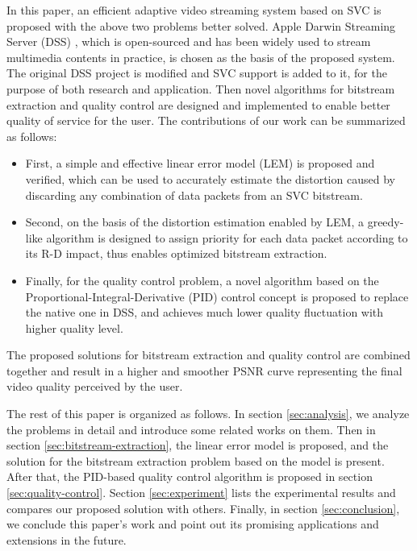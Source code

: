 \documentclass[journal]{IEEEtran}
\begin{document}
In this paper, an efficient adaptive video streaming system based on SVC is proposed with the above two problems better solved. Apple Darwin Streaming Server (DSS) \cite{DSS}, which is open-sourced and has been widely used to stream multimedia contents in practice, is chosen as the basis of the proposed system. The original DSS project is modified and SVC support is added to it, for the purpose of both research and application. Then novel algorithms for bitstream extraction and quality control are designed and implemented to enable better quality of service for the user. The contributions of our work can be summarized as follows:
\begin{itemize}
\item First, a simple and effective linear error model (LEM) is proposed and verified, which can be used to accurately estimate the distortion caused by discarding any combination of data packets from an SVC bitstream.
\item Second, on the basis of the distortion estimation enabled by LEM, a greedy-like algorithm is designed to assign priority for each data packet according to its R-D impact, thus enables optimized bitstream extraction.
\item Finally, for the quality control problem, a novel algorithm based on the Proportional-Integral-Derivative (PID) control concept is proposed to replace the native one in DSS, and achieves much lower quality fluctuation with higher quality level.
\end{itemize}

The proposed solutions for bitstream extraction and quality control are combined together and result in a higher and smoother PSNR curve representing the final video quality perceived by the user.

The rest of this paper is organized as follows. In section \ref{sec:analysis}, we analyze the problems in detail and introduce some related works on them. Then in section \ref{sec:bitstream-extraction}, the linear error model is proposed, and the solution for the bitstream extraction problem based on the model is present. After that, the PID-based quality control algorithm is proposed in section \ref{sec:quality-control}. Section \ref{sec:experiment} lists the experimental results and compares our proposed solution with others. Finally, in section \ref{sec:conclusion}, we conclude this paper's work and point out its promising applications and extensions in the future.


\end{document}

